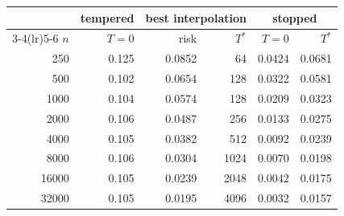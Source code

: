 \begin{tabular}{@{}rrrrrr@{}}
\toprule
& tempered & \multicolumn{2}{c}{best interpolation} & \multicolumn{2}{c}{stopped} \\
\cmidrule(lr){3-4}\cmidrule(lr){5-6}
$n$ & $T=0$ & risk & $T^\ast$ & $T=0$ & $T^\ast$ \\
\midrule
250 & 0.125 & 0.0852 & 64 & 0.0424 & 0.0681 \\
500 & 0.102 & 0.0654 & 128 & 0.0322 & 0.0581 \\
1000 & 0.104 & 0.0574 & 128 & 0.0209 & 0.0323 \\
2000 & 0.106 & 0.0487 & 256 & 0.0133 & 0.0275 \\
4000 & 0.105 & 0.0382 & 512 & 0.0092 & 0.0239 \\
8000 & 0.106 & 0.0304 & 1024 & 0.0070 & 0.0198 \\
16000 & 0.105 & 0.0239 & 2048 & 0.0042 & 0.0175 \\
32000 & 0.105 & 0.0195 & 4096 & 0.0032 & 0.0157 \\
\bottomrule
\end{tabular}
